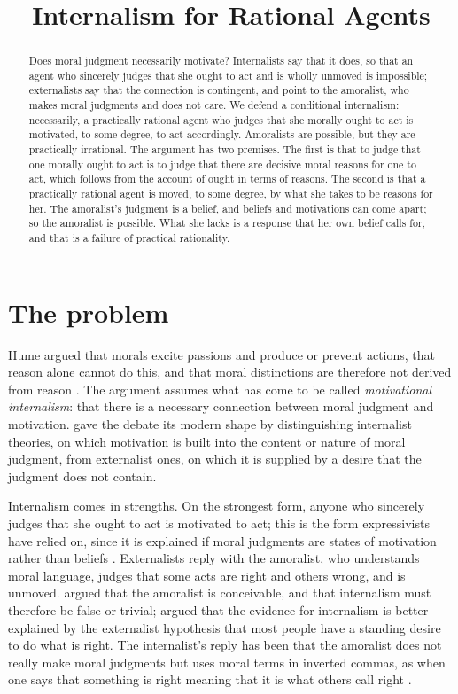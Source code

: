 \documentclass{situationist-preprint}
\title{Internalism for Rational Agents}
\begin{document}
\maketitle

\begin{abstract}
Does moral judgment necessarily motivate? Internalists say that it does, so that an agent who sincerely judges that she ought to act and is wholly unmoved is impossible; externalists say that the connection is contingent, and point to the amoralist, who makes moral judgments and does not care. We defend a conditional internalism: necessarily, a practically rational agent who judges that she morally ought to act is motivated, to some degree, to act accordingly. Amoralists are possible, but they are practically irrational. The argument has two premises. The first is that to judge that one morally ought to act is to judge that there are decisive moral reasons for one to act, which follows from the account of ought in terms of reasons. The second is that a practically rational agent is moved, to some degree, by what she takes to be reasons for her. The amoralist's judgment is a belief, and beliefs and motivations can come apart; so the amoralist is possible. What she lacks is a response that her own belief calls for, and that is a failure of practical rationality.
\end{abstract}

\section{The problem}

Hume argued that morals excite passions and produce or prevent actions, that reason alone cannot do this, and that moral distinctions are therefore not derived from reason \citep[3.1.1]{HumeTreatise}. The argument assumes what has come to be called \emph{motivational internalism}: that there is a necessary connection between moral judgment and motivation. \citet{Frankena1958} gave the debate its modern shape by distinguishing internalist theories, on which motivation is built into the content or nature of moral judgment, from externalist ones, on which it is supplied by a desire that the judgment does not contain.

Internalism comes in strengths. On the strongest form, anyone who sincerely judges that she ought to act is motivated to act; this is the form expressivists have relied on, since it is explained if moral judgments are states of motivation rather than beliefs \citep{Hare1952}. Externalists reply with the amoralist, who understands moral language, judges that some acts are right and others wrong, and is unmoved. \citet{Brink1989} argued that the amoralist is conceivable, and that internalism must therefore be false or trivial; \citet{Svavarsdottir1999} argued that the evidence for internalism is better explained by the externalist hypothesis that most people have a standing desire to do what is right. The internalist's reply has been that the amoralist does not really make moral judgments but uses moral terms in inverted commas, as when one says that something is right meaning that it is what others call right \citep{Hare1952,Smith1994}.
\end{document}
